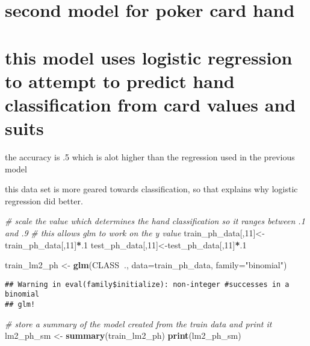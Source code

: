 \documentclass[]{article}
\newenvironment{Shaded}{\begin{snugshade}}{\end{snugshade}}
\newcommand{\KeywordTok}[1]{\textcolor[rgb]{0.13,0.29,0.53}{\textbf{#1}}}
\newcommand{\DataTypeTok}[1]{\textcolor[rgb]{0.13,0.29,0.53}{#1}}
\newcommand{\DecValTok}[1]{\textcolor[rgb]{0.00,0.00,0.81}{#1}}
\newcommand{\StringTok}[1]{\textcolor[rgb]{0.31,0.60,0.02}{#1}}
\newcommand{\CommentTok}[1]{\textcolor[rgb]{0.56,0.35,0.01}{\textit{#1}}}
\newcommand{\OperatorTok}[1]{\textcolor[rgb]{0.81,0.36,0.00}{\textbf{#1}}}
\newcommand{\NormalTok}[1]{#1}
\begin{document}
\section{second model for poker card
hand}\label{second-model-for-poker-card-hand}

\section{this model uses logistic regression to attempt to predict hand
classification from card values and
suits}\label{this-model-uses-logistic-regression-to-attempt-to-predict-hand-classification-from-card-values-and-suits}

the accuracy is .5 which is alot higher than the regression used in the
previous model

this data set is more geared towards classification, so that explains
why logistic regression did better.

\begin{Shaded}
\begin{Highlighting}[]
\CommentTok{# scale the value which determines the hand classification so it ranges between .1 and .9}
\CommentTok{# this allows glm to work on the y value}
\NormalTok{train_ph_data[,}\DecValTok{11}\NormalTok{]<-train_ph_data[,}\DecValTok{11}\NormalTok{]}\OperatorTok{*}\NormalTok{.}\DecValTok{1}
\NormalTok{test_ph_data[,}\DecValTok{11}\NormalTok{]<-test_ph_data[,}\DecValTok{11}\NormalTok{]}\OperatorTok{*}\NormalTok{.}\DecValTok{1}

\NormalTok{train_lm2_ph <-}\StringTok{ }\KeywordTok{glm}\NormalTok{(CLASS}\OperatorTok{~}\NormalTok{., }\DataTypeTok{data=}\NormalTok{train_ph_data, }\DataTypeTok{family=}\StringTok{"binomial"}\NormalTok{)}
\end{Highlighting}
\end{Shaded}

\begin{verbatim}
## Warning in eval(family$initialize): non-integer #successes in a binomial
## glm!
\end{verbatim}

\begin{Shaded}
\begin{Highlighting}[]
\CommentTok{# store a summary of the model created from the train data and print it}
\NormalTok{lm2_ph_sm <-}\StringTok{ }\KeywordTok{summary}\NormalTok{(train_lm2_ph)}
\KeywordTok{print}\NormalTok{(lm2_ph_sm)}
\end{Highlighting}
\end{Shaded}
\end{document}
